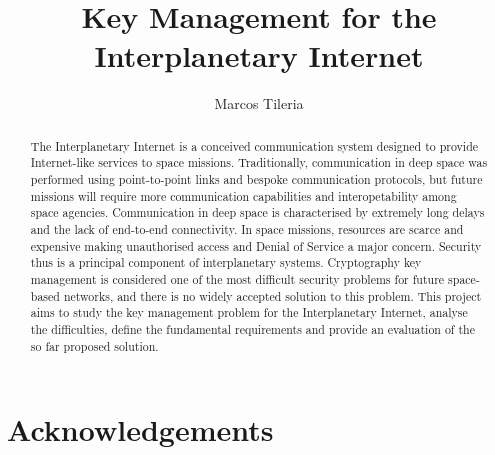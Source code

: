 \documentclass[11pt]{article} %
\title{Key Management for the Interplanetary Internet}
\author{Marcos Tileria}
\theoremstyle{plain}
\theoremstyle{definition}
\begin{document}
\maketitle




\begin{abstract}

  
The Interplanetary Internet is a conceived communication system designed to provide Internet-like services to space missions. 
Traditionally, communication in deep space was performed using point-to-point links and bespoke communication protocols, but future missions will require more communication capabilities and interopetability among space agencies. Communication in deep space is characterised by extremely long delays and the lack of end-to-end connectivity. In space missions, resources are scarce and expensive making unauthorised access and Denial of Service a major concern. Security thus is a principal component of interplanetary systems. Cryptography key management is considered one of the most difficult security problems for future space-based networks, and there is no widely accepted solution to this problem. This project aims to study the key management problem for the Interplanetary Internet, analyse the difficulties, define the fundamental requirements and provide an evaluation of the so far proposed solution.   

  
\end{abstract}




 \newpage


 \newpage


\newpage


\newpage





\section{Acknowledgements}




\clearpage
 
\printglossary[type=\acronymtype]


\end{document}
